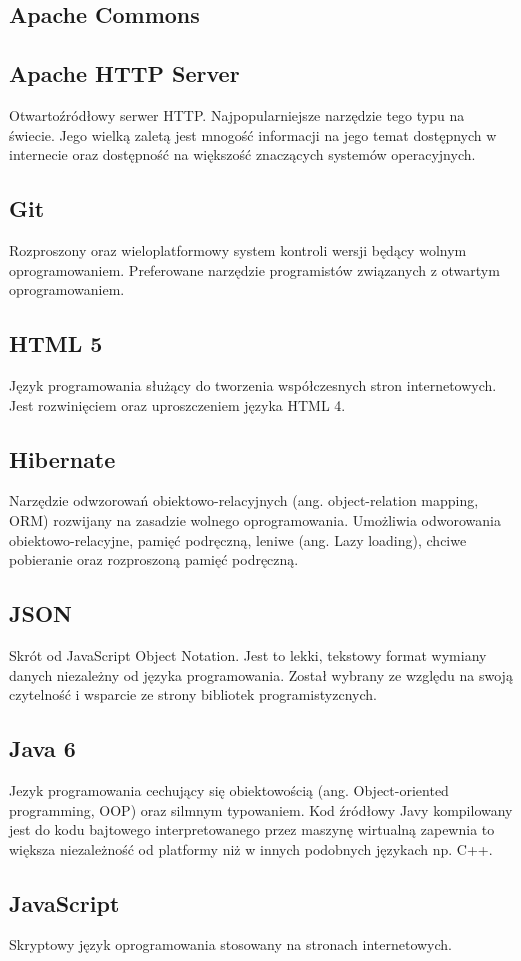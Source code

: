 \documentclass[11pt,a4paper,polish,thesis]{dcsbook}
\begin{document}
\subsection{Apache Commons}
\subsection{Apache HTTP Server}
Otwartoźródłowy serwer HTTP. Najpopularniejsze narzędzie tego typu na świecie. Jego wielką zaletą jest mnogość informacji na jego temat dostępnych w internecie oraz
dostępność na większość znaczących systemów operacyjnych.
\subsection{Git}
Rozproszony oraz wieloplatformowy system kontroli wersji będący wolnym oprogramowaniem. Preferowane narzędzie programistów związanych z otwartym oprogramowaniem.
\subsection{HTML 5}
Język programowania służący do tworzenia współczesnych stron internetowych. Jest rozwinięciem oraz uproszczeniem języka HTML 4.
\subsection{Hibernate}
Narzędzie odwzorowań obiektowo-relacyjnych (ang. object-relation mapping, ORM) rozwijany na zasadzie wolnego oprogramowania. Umożliwia odworowania obiektowo-relacyjne, pamięć podręczną, leniwe (ang. Lazy loading), chciwe pobieranie oraz rozproszoną pamięć podręczną.
\subsection{JSON}
Skrót od JavaScript Object Notation. Jest to lekki, tekstowy format wymiany danych niezależny od języka programowania. Został wybrany ze względu na swoją czytelność i wsparcie ze strony bibliotek programistyzcnych.
\subsection{Java 6}
Jezyk programowania cechujący się obiektowością (ang. Object-oriented programming, OOP) oraz silmnym typowaniem. Kod źródłowy Javy kompilowany jest do kodu bajtowego interpretowanego przez maszynę wirtualną zapewnia to większa niezależność od platformy niż w innych podobnych językach np. C++.
\subsection{JavaScript}
Skryptowy język oprogramowania stosowany na stronach internetowych.
\end{document}
